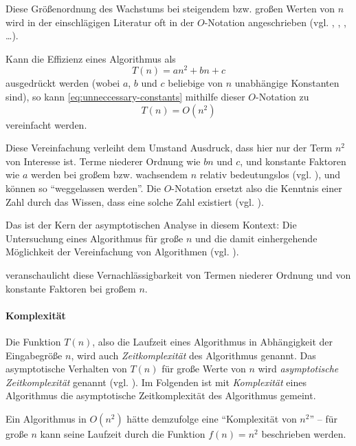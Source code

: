 Diese Größenordnung des Wachstums bei steigendem bzw. großen Werten von $n$ wird in der einschlägigen Literatur oft in der $O$-Notation angeschrieben (vgl. \cite[2]{ahu1974}, \cite[107]{taocp1}, \cite[29]{hsr1997}, \ldots).

Kann die Effizienz eines Algorithmus als
\begin{equation}\label{eq:unneccessary-constants}
    T(n) = an^2 + bn + c
\end{equation}
ausgedrückt werden (wobei $a$, $b$ und $c$ beliebige von $n$ unabhängige Konstanten sind), so kann \eqref{eq:unneccessary-constants} mithilfe dieser $O$-Notation zu
\begin{equation}\label{eq:basic-o-notation}
    T(n) = O(n^2)
\end{equation}
vereinfacht werden.

Diese Vereinfachung verleiht dem Umstand Ausdruck, dass hier nur der Term $n^2$ von Interesse ist. Terme niederer Ordnung wie $bn$ und $c$, und konstante Faktoren wie $a$ werden bei großem bzw. wachsendem $n$ relativ bedeutungslos (vgl. \cite[28]{clrs2001}), und können so \enquote{weggelassen werden}. Die $O$-Notation ersetzt also die Kenntnis einer Zahl durch das Wissen, dass eine solche Zahl existiert (vgl. \cite[3]{bru1958}).

Das ist der Kern der asymptotischen Analyse in diesem Kontext: Die Untersuchung eines Algorithmus für große $n$ und die damit einhergehende Möglichkeit der Vereinfachung von Algorithmen (vgl. \cite[63]{sha2011}).



 veranschaulicht diese Vernachlässigbarkeit von Termen niederer Ordnung und von konstante Faktoren bei großem $n$.

\paragraph{Komplexität} Die Funktion $T(n)$, also die Laufzeit eines Algorithmus in Abhängigkeit der Eingabegröße $n$, wird auch \emph{Zeitkomplexität} des Algorithmus genannt. Das asymptotische Verhalten von $T(n)$ für große Werte von $n$ wird \emph{asymptotische Zeitkomplexität} genannt (vgl. \cite[2]{ahu1974}). Im Folgenden ist mit \emph{Komplexität} eines Algorithmus die asymptotische Zeitkomplexität des Algorithmus gemeint.

Ein Algorithmus in $O(n^2)$ hätte demzufolge eine \enquote{Komplexität von $n^2$} -- für große $n$ kann seine Laufzeit durch die Funktion $f(n) = n^2$ beschrieben werden.

